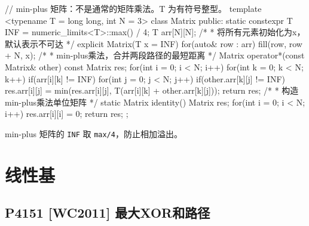 \begin{codeline}
// min-plus 矩阵：不是通常的矩阵乘法。T 为有符号整型。
template <typename T = long long, int N = 3>
class Matrix {
public:
    static constexpr T INF = numeric_limits<T>::max() / 4;
    T arr[N][N];
    /*
     * 将所有元素初始化为x，默认表示不可达
     */
    explicit Matrix(T x = INF) {
        for(auto& row : arr) {
            fill(row, row + N, x);
        }
    }
    /*
     * min-plus乘法，合并两段路径的最短距离
     */
    Matrix operator*(const Matrix& other) const {
        Matrix res;
        for(int i = 0; i < N; i++) {
            for(int k = 0; k < N; k++) {
                if(arr[i][k] != INF) {
                    for(int j = 0; j < N; j++) {
                        if(other.arr[k][j] != INF) {
                            res.arr[i][j] = min(res.arr[i][j], T(arr[i][k] + other.arr[k][j]));
                        }
                    }
                }
            }
        }
        return res;
    }
    /*
     * 构造min-plus乘法单位矩阵
     */
    static Matrix identity() {
        Matrix res;
        for(int i = 0; i < N; i++) {
            res.arr[i][i] = 0;
        }
        return res;
    }
};
\end{codeline}
\begin{warnbox}
min-plus 矩阵的 \texttt{INF} 取 \texttt{max/4}，防止相加溢出。
\end{warnbox}

\section{线性基}
\subsection{P4151 {[}WC2011{]} 最大XOR和路径}\label{p4151-wc2011-ux6700ux5927xorux548cux8defux5f84}



